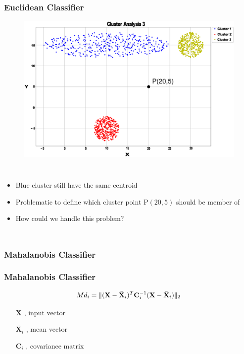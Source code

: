 \documentclass[aspectratio=10]{beamer} %
\begin{document}
\begin{frame}
\frametitle{Euclidean Classifier}
\begin{figure}[H]
	\includegraphics[scale=0.12]{Imagens/clusteranalise3.eps}
\end{figure}

    \begin{columns}
    	\footnotesize
    	\justifying
\begin{itemize}
	\item Blue cluster still have the same centroid
	\pause 
	\item Problematic to define which cluster point P$(20,5)$ should be member of 
	\pause
	\item How could we handle this problem?
\end{itemize}
\end{columns}
\end{frame}

\subsubsection{Mahalanobis Classifier}

\begin{frame}
	\frametitle{Mahalanobis Classifier}
	\begin{tcolorbox}[colback=gray!5,colframe=blue!40!black,title=Definition]
	  \begin{equation}
			Md_{i}=\Arrowvert(\textbf{X}-\bar{\textbf{X}}_{i})^{T}\textbf{C}_{i}^{-1}(\textbf{X}-\bar{\textbf{X}}_{i})\Arrowvert_{2}\nonumber
			\label{eq5}
		\end{equation}
	\end{tcolorbox}
	 \pause
	\begin{itemize}
		\centering
    	\item[$\textbf{X}$], input vector 
		\pause
		\item[$\bar{\textbf{X}}_{i}$], mean vector
		\pause
		\item[$\textbf{C}_{i}$], covariance matrix
	\end{itemize}
\end{frame}
\end{document}
